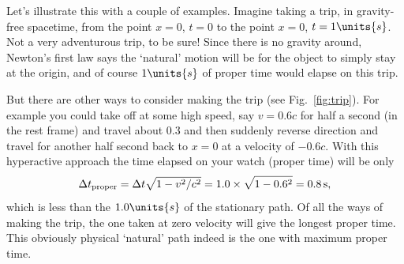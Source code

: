 Let's illustrate this with a couple of examples.
Imagine taking a trip, in gravity-free spacetime, from the point $x =
0$, $t = 0$ to the point $x = 0$, $t = 1\units{s}$.  Not a very adventurous
trip, to be sure!  Since there is no gravity around, Newton's first law
says the `natural' motion will be for the object to simply stay at the
origin, and of course $1\units{s}$ of proper time would elapse on this
trip. 

But there are other ways to consider making the trip (see
Fig.~\ref{fig:trip}).  For example you could take off at some high
speed, say $v = 0.6 c$ for half a second (in the rest frame) and
travel about 0.3 and then suddenly reverse direction and
travel for another half second back to $x = 0$ at a velocity of $-0.6
c$.  With this hyperactive approach the time elapsed on your watch
(proper time) will be only
\begin{equation}
\Delta t_{\rm proper} = \Delta t \sqrt{1 - v^2/c^2} = 
      1.0 \times \sqrt{1 - 0.6^2} = 0.8\, \mbox{s},
\label{eq:deltatnograv}
\end{equation}     
which is less than the $1.0\units{s}$ of the stationary path.
Of all the ways of making the trip, the one taken at zero velocity
will give the longest proper time.  This obviously physical
`natural' path indeed is the one with maximum proper time.
        
